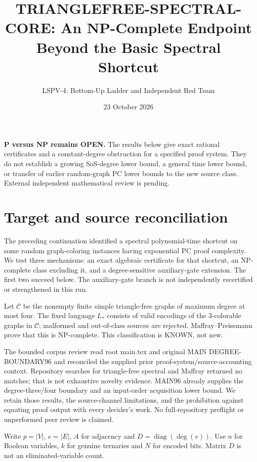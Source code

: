 \documentclass[11pt]{article}
\title{TRIANGLEFREE-SPECTRAL-CORE: An NP-Complete Endpoint Beyond the Basic Spectral Shortcut}
\author{LSPV-4: Bottom-Up Ladder and Independent Red Team}
\date{23 October 2026}
\begin{document}
\maketitle
\noindent\textbf{P versus NP remains OPEN.} The results below give exact rational certificates and a constant-degree obstruction for a specified proof system. They do not establish a growing SoS-degree lower bound, a general time lower bound, or transfer of earlier random-graph PC lower bounds to the new source class. External independent mathematical review is pending.

\section{Target and source reconciliation}
The preceding continuation identified a spectral polynomial-time shortcut on some random graph-coloring instances having exponential PC proof complexity. We test three mechanisms: an exact algebraic certificate for that shortcut, an NP-complete class excluding it, and a degree-sensitive auxiliary-gate extension. The first two succeed below. The auxiliary-gate branch is not independently recertified or strengthened in this run.

Let $\mathcal C$ be the nonempty finite simple triangle-free graphs of maximum degree at most four. The fixed language $L_*$ consists of valid encodings of the 3-colorable graphs in $\mathcal C$; malformed and out-of-class sources are rejected. Maffray--Preissmann prove that this is NP-complete. This classification is KNOWN, not new.

The bounded corpus review read root main.tex and original MAIN DEGREE-BOUNDARY96 and reconciled the supplied prior proof-system/source-accounting context. Repository searches for triangle-free spectral and Maffray returned no matches; that is not exhaustive novelty evidence. MAIN96 already supplies the degree-three/four boundary and an input-order acquisition lower bound. We retain those results, the source-channel limitations, and the prohibition against equating proof output with every decider's work. No full-repository preflight or unperformed peer review is claimed.

Write $p=|V|$, $e=|E|$, $A$ for adjacency and $D=\operatorname{diag}(\deg(v))$. Use $n$ for Boolean variables, $k$ for genuine ternaries and $N$ for encoded bits. Matrix $D$ is not an eliminated-variable count.
\end{document}
